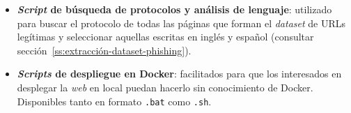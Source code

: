 \begin{itemize}
\item \textbf{\textit{Script} de búsqueda de protocolos y análisis de lenguaje}: utilizado para buscar el protocolo de todas las páginas que forman el \textit{dataset} de URLs legítimas y seleccionar aquellas escritas en inglés y español (consultar sección~\ref{ss:extracción-dataset-phishing}).

\item \textbf{\textit{Scripts} de despliegue en Docker}: facilitados para que los interesados en desplegar la \textit{web} en local puedan hacerlo sin conocimiento de Docker. Disponibles tanto en formato \texttt{.bat} como \texttt{.sh}.

\end{itemize}